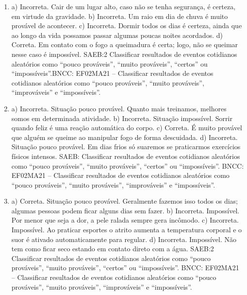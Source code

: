 \begin{enumerate}
\item
a) Incorreta. Cair de um lugar alto, caso não se tenha segurança, é certeza, em virtude da gravidade.
b) Incorreta. Um raio em dia de chuva é muito provável de acontecer.
c) Incorreta. Dormir todos os dias é certeza, ainda que ao longo da vida possamos passar algumas poucas noites acordados.
d) Correta. Em contato com o fogo a queimadura é certa; logo, não se queimar nesse caso é impossível.
SAEB:2 Classificar resultados de eventos cotidianos aleatórios como ``pouco prováveis'', ``muito prováveis'', ``certos'' ou ``impossíveis''.BNCC: EF02MA21 -- Classificar resultados de eventos cotidianos aleatórios como ``pouco prováveis'', ``muito prováveis'', ``improváveis'' e ``impossíveis''.

\item
a) Incorreta. Situação pouco provável. Quanto mais treinamos, melhores somos em determinada atividade.
b) Incorreta. Situação impossível. Sorrir quando feliz é uma reação
automática do corpo.
c) Correta. É muito provável que alguém se queime ao manipular fogo de
forma descuidada.
d) Incorreta. Situação pouco provável. Em dias frios só suaremos se
praticarmos exercícios físicos intensos.
SAEB: Classificar resultados de eventos cotidianos aleatórios como ``pouco prováveis'', ``muito prováveis'', ``certos'' ou ``impossíveis''. BNCC: EF02MA21 -- Classificar resultados de eventos cotidianos aleatórios como ``pouco prováveis'', ``muito prováveis'', ``improváveis'' e ``impossíveis''.

\item
a) Correta. Situação pouco provável. Geralmente fazemos isso todos os
dias; algumas pessoas podem ficar alguns dias sem fazer.
b) Incorreta. Impossível. Por menor que seja a dor, a pele ralada sempre gera incômodo.
c) Incorreta. Impossível. Ao praticar esportes o atrito aumenta a
temperatura corporal e o suor é ativado automaticamente para regular.
d) Incorreta. Impossível. Não tem como ficar seco estando em contato direto com a água.
SAEB:2 Classificar resultados de eventos cotidianos aleatórios como ``pouco prováveis'', ``muito prováveis'', ``certos'' ou ``impossíveis''. BNCC: EF02MA21 -- Classificar resultados de eventos cotidianos aleatórios como ``pouco prováveis'', ``muito prováveis'', ``improváveis'' e ``impossíveis''.
\end{enumerate}


